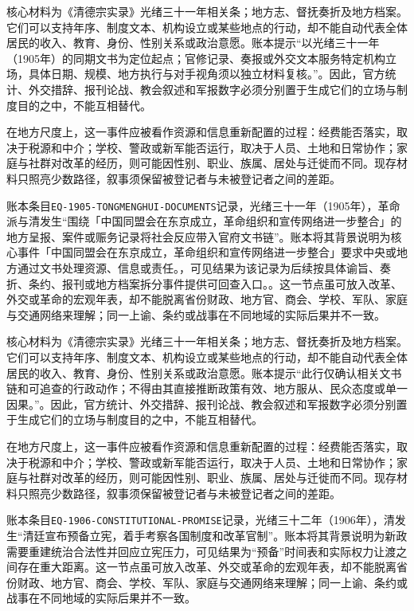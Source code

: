核心材料为《清德宗实录》光绪三十一年相关条；地方志、督抚奏折及地方档案。它们可以支持年序、制度文本、机构设立或某些地点的行动，却不能自动代表全体居民的收入、教育、身份、性别关系或政治意愿。账本提示“以光绪三十一年（1905年）的同期文书为定位起点；官修记录、奏报或外交文本服务特定机构立场，具体日期、规模、地方执行与对手视角须以独立材料复核。”。因此，官方统计、外交措辞、报刊论战、教会叙述和军报数字必须分别置于生成它们的立场与制度目的之中，不能互相替代。

在地方尺度上，这一事件应被看作资源和信息重新配置的过程：经费能否落实，取决于税源和中介；学校、警政或新军能否运行，取决于人员、土地和日常协作；家庭与社群对改革的经历，则可能因性别、职业、族属、居处与迁徙而不同。现存材料只照亮少数路径，叙事须保留被登记者与未被登记者之间的差距。

账本条目\texttt{EQ-1905-TONGMENGHUI-DOCUMENTS}记录，光绪三十一年（1905年），革命派与清发生“围绕「中国同盟会在东京成立，革命组织和宣传网络进一步整合」的地方呈报、案件或赈务记录将社会反应带入官府文书链”。账本将其背景说明为核心事件「中国同盟会在东京成立，革命组织和宣传网络进一步整合」要求中央或地方通过文书处理资源、信息或责任。，可见结果为该记录为后续按具体谕旨、奏折、条约、报刊或地方档案拆分事件提供可回查入口。。这一节点虽可放入改革、外交或革命的宏观年表，却不能脱离省份财政、地方官、商会、学校、军队、家庭与交通网络来理解；同一上谕、条约或战事在不同地域的实际后果并不一致。

核心材料为《清德宗实录》光绪三十一年相关条；地方志、督抚奏折及地方档案。它们可以支持年序、制度文本、机构设立或某些地点的行动，却不能自动代表全体居民的收入、教育、身份、性别关系或政治意愿。账本提示“此行仅确认相关文书链和可追查的行政动作；不得由其直接推断政策有效、地方服从、民众态度或单一因果。”。因此，官方统计、外交措辞、报刊论战、教会叙述和军报数字必须分别置于生成它们的立场与制度目的之中，不能互相替代。

在地方尺度上，这一事件应被看作资源和信息重新配置的过程：经费能否落实，取决于税源和中介；学校、警政或新军能否运行，取决于人员、土地和日常协作；家庭与社群对改革的经历，则可能因性别、职业、族属、居处与迁徙而不同。现存材料只照亮少数路径，叙事须保留被登记者与未被登记者之间的差距。

账本条目\texttt{EQ-1906-CONSTITUTIONAL-PROMISE}记录，光绪三十二年（1906年），清发生“清廷宣布预备立宪，着手考察各国制度和改革官制”。账本将其背景说明为新政需要重建统治合法性并回应立宪压力，可见结果为“预备”时间表和实际权力让渡之间存在重大距离。这一节点虽可放入改革、外交或革命的宏观年表，却不能脱离省份财政、地方官、商会、学校、军队、家庭与交通网络来理解；同一上谕、条约或战事在不同地域的实际后果并不一致。

